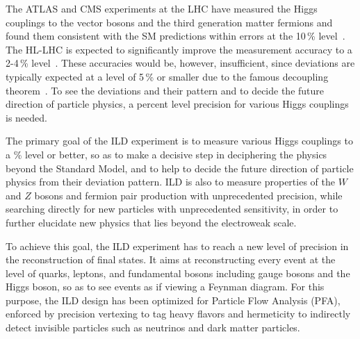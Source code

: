The ATLAS and CMS experiments at the LHC have measured the Higgs couplings to the vector bosons and the third generation matter fermions and found them consistent with the SM predictions within errors at the 10\,\% level~\cite{Cepeda:2019klc}. The HL-LHC is expected to significantly improve the measurement accuracy to a 2-4\,\% level~\cite{Cepeda:2019klc}. These accuracies would be, however, insufficient, since deviations are typically expected at a level of 5\,\% or smaller due to the famous decoupling theorem~\cite{Ref:Decoupling}. To see the deviations and their pattern and to decide the future direction of particle physics, a percent level precision for various Higgs couplings is needed.

The primary goal of the ILD experiment is to measure various Higgs couplings to a \% level or better, so as to make a decisive step in deciphering the physics beyond the Standard Model, and to help to 
decide the future direction of particle physics from their deviation pattern. ILD is also to measure properties of the $W$ and $Z$ bosons and fermion pair production with unprecedented precision, while searching directly for new particles with unprecedented sensitivity, in order to further elucidate new physics that lies beyond the electroweak scale.

To achieve this goal, the ILD experiment has to reach a new level of precision in the reconstruction of final states. It aims at reconstructing every event at the level of quarks, leptons, and fundamental bosons including gauge bosons and the Higgs boson, so as to see events as if viewing a Feynman diagram. For this purpose, the ILD design has been optimized for Particle Flow Analysis (PFA), enforced by precision vertexing to tag heavy flavors and hermeticity to indirectly detect invisible particles such as neutrinos and dark matter particles. 

